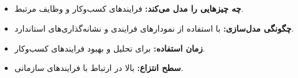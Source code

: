 \subsection*{}
\begin{itemize}
	\item \textbf{چه چیزهایی را مدل می‌کند:} فرایندهای کسب‌وکار و وظایف مرتبط.
	\item \textbf{چگونگی مدل‌سازی:} با استفاده از نمودارهای فرایندی و نشانه‌گذاری‌های استاندارد.
	\item \textbf{زمان استفاده:} برای تحلیل و بهبود فرایندهای کسب‌وکار.
	\item \textbf{سطح انتزاع:} بالا در ارتباط با فرایندهای سازمانی.
\end{itemize}


